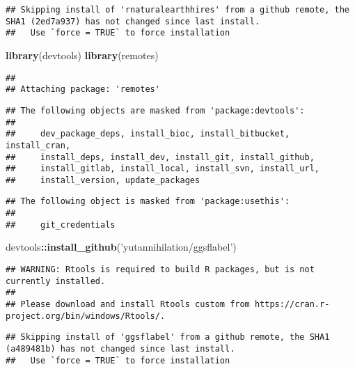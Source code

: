 \documentclass[
]{article}
\newenvironment{Shaded}{\begin{snugshade}}{\end{snugshade}}
\newcommand{\KeywordTok}[1]{\textcolor[rgb]{0.13,0.29,0.53}{\textbf{#1}}}
\newcommand{\NormalTok}[1]{#1}
\newcommand{\OperatorTok}[1]{\textcolor[rgb]{0.81,0.36,0.00}{\textbf{#1}}}
\newcommand{\StringTok}[1]{\textcolor[rgb]{0.31,0.60,0.02}{#1}}
\begin{document}
\begin{verbatim}
## Skipping install of 'rnaturalearthhires' from a github remote, the SHA1 (2ed7a937) has not changed since last install.
##   Use `force = TRUE` to force installation
\end{verbatim}

\begin{Shaded}
\begin{Highlighting}[]
\KeywordTok{library}\NormalTok{(devtools)}
\KeywordTok{library}\NormalTok{(remotes)}
\end{Highlighting}
\end{Shaded}

\begin{verbatim}
## 
## Attaching package: 'remotes'
\end{verbatim}

\begin{verbatim}
## The following objects are masked from 'package:devtools':
## 
##     dev_package_deps, install_bioc, install_bitbucket, install_cran,
##     install_deps, install_dev, install_git, install_github,
##     install_gitlab, install_local, install_svn, install_url,
##     install_version, update_packages
\end{verbatim}

\begin{verbatim}
## The following object is masked from 'package:usethis':
## 
##     git_credentials
\end{verbatim}

\begin{Shaded}
\begin{Highlighting}[]
\NormalTok{devtools}\OperatorTok{::}\KeywordTok{install_github}\NormalTok{(}\StringTok{'yutannihilation/ggsflabel'}\NormalTok{)}
\end{Highlighting}
\end{Shaded}

\begin{verbatim}
## WARNING: Rtools is required to build R packages, but is not currently installed.
## 
## Please download and install Rtools custom from https://cran.r-project.org/bin/windows/Rtools/.
\end{verbatim}

\begin{verbatim}
## Skipping install of 'ggsflabel' from a github remote, the SHA1 (a489481b) has not changed since last install.
##   Use `force = TRUE` to force installation
\end{verbatim}
\end{document}
